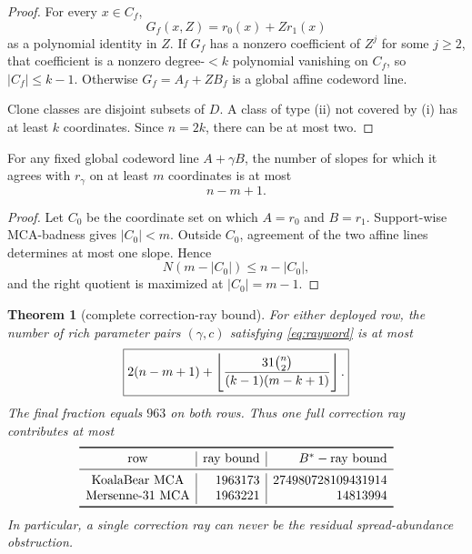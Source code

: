 \documentclass[11pt,a4paper]{amsart}
\numberwithin{equation}{section}
\newtheorem{theorem}{Theorem}[section]
\theoremstyle{remark}
\begin{document}
\begin{proof}
For every $x\in C_f$,
\[
 G_f(x,Z)=r_0(x)+Zr_1(x)
\]
as a polynomial identity in $Z$.  If $G_f$ has a nonzero coefficient of $Z^j$ for some $j\ge2$, that coefficient is a nonzero degree-$<k$ polynomial vanishing on $C_f$, so $|C_f|\le k-1$.  Otherwise $G_f=A_f+ZB_f$ is a global affine codeword line.

Clone classes are disjoint subsets of $D$.  A class of type (ii) not covered by (i) has at least $k$ coordinates.  Since $n=2k$, there can be at most two.
\end{proof}

\begin{lemma}\label{lem:affine-block}
For any fixed global codeword line $A+\gamma B$, the number of slopes for which it agrees with $r_\gamma$ on at least $m$ coordinates is at most
\begin{equation}\label{eq:affinecost}
 n-m+1.
\end{equation}
\end{lemma}

\begin{proof}
Let $C_0$ be the coordinate set on which $A=r_0$ and $B=r_1$.  Support-wise MCA-badness gives $|C_0|<m$.  Outside $C_0$, agreement of the two affine lines determines at most one slope.  Hence
\[
 N(m-|C_0|)\le n-|C_0|,
\]
and the right quotient is maximized at $|C_0|=m-1$.
\end{proof}

\begin{theorem}[complete correction-ray bound]\label{thm:ray}
For either deployed row, the number of rich parameter pairs $(\gamma,c)$ satisfying \eqref{eq:rayword} is at most
\begin{equation}\label{eq:raybound}
 \boxed{
 2(n-m+1)
 +\left\lfloor \frac{31\binom n2}{(k-1)(m-k+1)}\right\rfloor.
 }
\end{equation}
The final fraction equals $963$ on both rows.  Thus one full correction ray contributes at most
\[
\begin{array}{c|r|r}
\toprule
\text{row}&\text{ray bound}&B^*-\text{ray bound}\\
\midrule
\text{KoalaBear MCA}&1963173&274980728109431914\\
\text{Mersenne-31 MCA}&1963221&14813994\\
\bottomrule
\end{array}
\]
In particular, a single correction ray can never be the residual spread-abundance obstruction.
\end{theorem}
\end{document}
